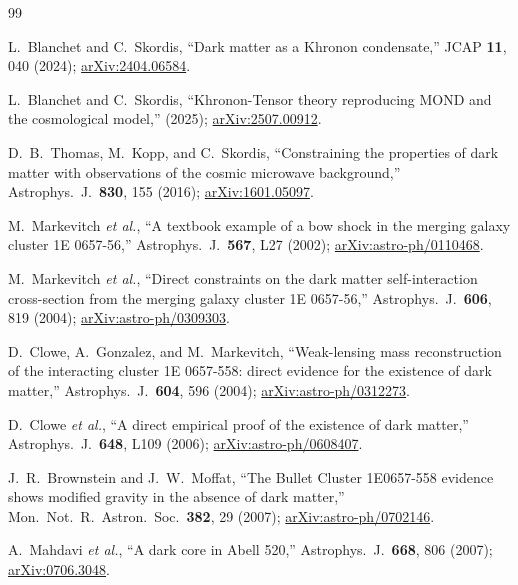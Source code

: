 \documentclass[prd,twocolumn,superscriptaddress,longbibliography,floatfix]{revtex4-2}
\begin{document}
\begin{thebibliography}{99}

L.~Blanchet and C.~Skordis,
``Dark matter as a Khronon condensate,''
JCAP \textbf{11}, 040 (2024);
\href{https://arxiv.org/abs/2404.06584}{arXiv:2404.06584}.

L.~Blanchet and C.~Skordis,
``Khronon-Tensor theory reproducing MOND and the cosmological model,''
(2025);
\href{https://arxiv.org/abs/2507.00912}{arXiv:2507.00912}.

D.~B.~Thomas, M.~Kopp, and C.~Skordis,
``Constraining the properties of dark matter with
observations of the cosmic microwave background,''
Astrophys.\ J.\ \textbf{830}, 155 (2016);
\href{https://arxiv.org/abs/1601.05097}{arXiv:1601.05097}.

M.~Markevitch \emph{et al.},
``A textbook example of a bow shock in the merging galaxy cluster 1E 0657-56,''
Astrophys.\ J.\ \textbf{567}, L27 (2002);
\href{https://arxiv.org/abs/astro-ph/0110468}{arXiv:astro-ph/0110468}.

M.~Markevitch \emph{et al.},
``Direct constraints on the dark matter self-interaction
cross-section from the merging galaxy cluster 1E 0657-56,''
Astrophys.\ J.\ \textbf{606}, 819 (2004);
\href{https://arxiv.org/abs/astro-ph/0309303}{arXiv:astro-ph/0309303}.

D.~Clowe, A.~Gonzalez, and M.~Markevitch,
``Weak-lensing mass reconstruction of the interacting cluster
1E 0657-558: direct evidence for the existence of dark matter,''
Astrophys.\ J.\ \textbf{604}, 596 (2004);
\href{https://arxiv.org/abs/astro-ph/0312273}{arXiv:astro-ph/0312273}.

D.~Clowe \emph{et al.},
``A direct empirical proof of the existence of dark matter,''
Astrophys.\ J.\ \textbf{648}, L109 (2006);
\href{https://arxiv.org/abs/astro-ph/0608407}{arXiv:astro-ph/0608407}.

J.~R.~Brownstein and J.~W.~Moffat,
``The Bullet Cluster 1E0657-558 evidence shows modified gravity in
the absence of dark matter,''
Mon.\ Not.\ R.\ Astron.\ Soc.\ \textbf{382}, 29 (2007);
\href{https://arxiv.org/abs/astro-ph/0702146}{arXiv:astro-ph/0702146}.

A.~Mahdavi \emph{et al.},
``A dark core in Abell 520,''
Astrophys.\ J.\ \textbf{668}, 806 (2007);
\href{https://arxiv.org/abs/0706.3048}{arXiv:0706.3048}.


\end{thebibliography}
\end{document}
